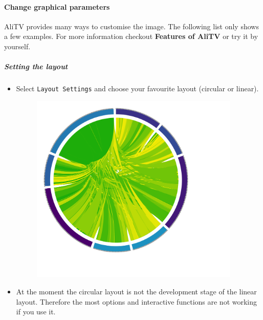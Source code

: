 \documentclass[a4paper]{scrartcl}
\begin{document}
\paragraph*{Change graphical parameters}
AliTV provides many ways to customise the image. The following list only shows a few examples. For more information checkout \textbf{Features of AliTV} or try it by yourself.

\subparagraph*{Setting the layout}
\begin{itemize}
	\item Select \texttt{Layout Settings} and choose your favourite layout (circular or linear).
	
	\begin{figure}[H]
		\centering
		\includegraphics[width=10cm]{circular.png}
		\caption{}
	\end{figure}

	 \item At the moment the circular layout is not the development stage of the linear layout. Therefore the most options and interactive functions are not working if you use it.
\end{itemize}
\end{document}
